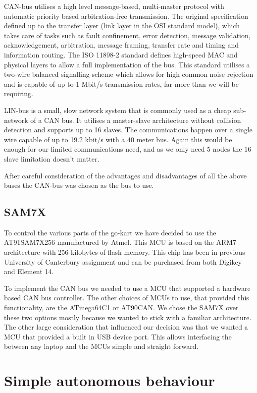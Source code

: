 CAN-bus utilises a high level message-based, multi-master protocol with
automatic priority based arbitration-free transmission.  The original
specification defined up to the transfer layer (link layer in the OSI standard
model), which takes care of tasks such as fault confinement, error detection,
message validation, acknowledgement, arbitration, message framing, transfer rate
and timing and information routing.  The ISO 11898-2 standard defines high-speed
MAC and physical layers to allow a full implementation of the bus.  This
standard utilises a two-wire balanced signalling scheme which allows for high
common noise rejection and is capable of up to 1 Mbit/s transmission rates, far
more than we will be requiring.

LIN-bus is a small, slow network system that is commonly used as a cheap
sub-network of a CAN bus.  It utilises a master-slave architecture without
collision detection and supports up to 16 slaves.  The communications happen
over a single wire capable of up to 19.2 kbit/s with a 40 meter bus.  Again this
would be enough for our limited communications need, and as we only need 5 nodes
the 16 slave limitation doesn't matter.

After careful consideration of the advantages and disadvantages of all the above
buses the CAN-bus was chosen as the bus to use. 

\subsection{SAM7X}
To control the various parts of the go-kart we have decided to use the
AT91SAM7X256\cite{SAM7Xdatasheet} manufactured by Atmel. This MCU is
based on the ARM7 architecture with 256 kilobytes of flash memory. This chip has
been in previous University of Canterbury assignment and can be purchased from
both Digikey and Element 14.

To implement the CAN bus we needed to use a MCU that supported a hardware based
CAN bus controller. The other choices of MCUs to use, that provided this
functionality, are the ATmega64C1 or AT90CAN. We chose the SAM7X over these two
options mostly because we wanted to stick with a familiar architecture. The
other large consideration that influenced our decision was that we wanted a MCU
that provided a built in USB device port. This allows interfacing the between
any laptop and the MCUs simple and straight forward.

\section{Simple autonomous behaviour}

